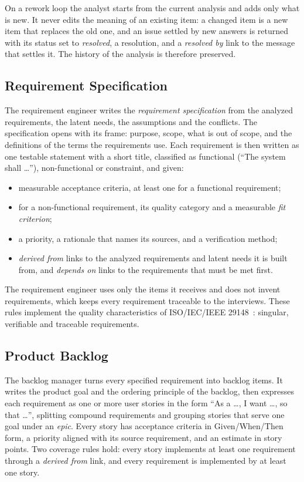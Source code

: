On a rework loop the analyst starts from the current analysis and adds only what is new. It never edits the meaning of an existing item: a changed item is a new item that replaces the old one, and an issue settled by new answers is returned with its status set to \emph{resolved}, a resolution, and a \emph{resolved by} link to the message that settles it. The history of the analysis is therefore preserved.

\subsection{Requirement Specification}
\label{sec:pa-specification}

The requirement engineer writes the \emph{requirement specification} from the analyzed requirements, the latent needs, the assumptions and the conflicts. The specification opens with its frame: purpose, scope, what is out of scope, and the definitions of the terms the requirements use. Each requirement is then written as one testable statement with a short title, classified as functional (``The system shall \ldots''), non-functional or constraint, and given:
\begin{itemize}
    \item measurable acceptance criteria, at least one for a functional requirement;
    \item for a non-functional requirement, its quality category and a measurable \emph{fit criterion};
    \item a priority, a rationale that names its sources, and a verification method;
    \item \emph{derived from} links to the analyzed requirements and latent needs it is built from, and \emph{depends on} links to the requirements that must be met first.
\end{itemize}
The requirement engineer uses only the items it receives and does not invent requirements, which keeps every requirement traceable to the interviews. These rules implement the quality characteristics of ISO/IEC/IEEE 29148~\cite{iso29148}: singular, verifiable and traceable requirements.

\subsection{Product Backlog}
\label{sec:pa-backlog}

The backlog manager turns every specified requirement into backlog items. It writes the product goal and the ordering principle of the backlog, then expresses each requirement as one or more user stories in the form ``As a \ldots, I want \ldots, so that \ldots'', splitting compound requirements and grouping stories that serve one goal under an \emph{epic}. Every story has acceptance criteria in Given/When/Then form, a priority aligned with its source requirement, and an estimate in story points. Two coverage rules hold: every story implements at least one requirement through a \emph{derived from} link, and every requirement is implemented by at least one story.

